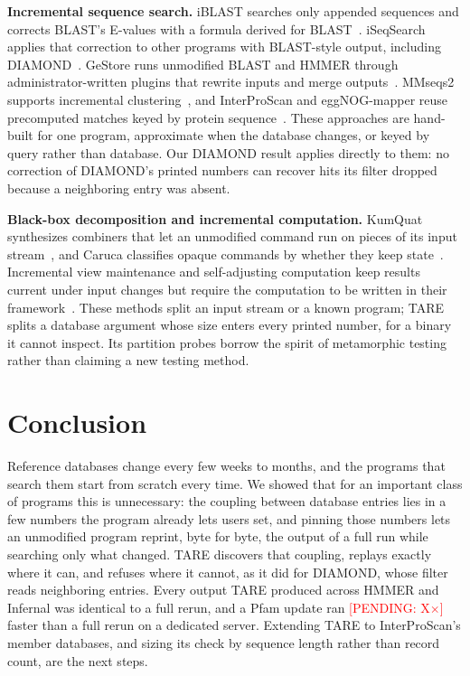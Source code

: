 \documentclass[letterpaper,twocolumn,10pt]{article}
\theoremstyle{definition}
\newcommand{\sys}{TARE\xspace}
\newcommand{\pending}[1]{\textcolor{red}{[PENDING: #1]}}
\begin{document}
\textbf{Incremental sequence search.} iBLAST searches only appended sequences and corrects BLAST's E-values with a formula
derived for BLAST~\cite{dash2021iblast}. iSeqSearch applies that correction to other programs with BLAST-style output,
including DIAMOND~\cite{yoo2025iseqsearch}. GeStore runs unmodified BLAST and HMMER through administrator-written plugins
that rewrite inputs and merge outputs~\cite{pedersen2014gestore}. MMseqs2 supports incremental
clustering~\cite{steinegger2017mmseqs2}, and InterProScan and eggNOG-mapper reuse precomputed matches keyed by protein
sequence~\cite{jones2014interproscan,cantalapiedra2021eggnog}. These approaches are hand-built for one program, approximate
when the database changes, or keyed by query rather than database. Our DIAMOND result applies directly to them: no
correction of DIAMOND's printed numbers can recover hits its filter dropped because a neighboring entry was absent.

\textbf{Black-box decomposition and incremental computation.} KumQuat synthesizes combiners that let an unmodified command
run on pieces of its input stream~\cite{shen2022kumquat}, and Caruca classifies opaque commands by whether they keep
state~\cite{lamprou2025caruca}. Incremental view maintenance and self-adjusting computation keep results current under
input changes but require the computation to be written in their framework~\cite{blakeley1986views,acar2003selective}.
These methods split an input stream or a known program; \sys splits a database argument whose size enters every printed
number, for a binary it cannot inspect. Its partition probes borrow the spirit of metamorphic
testing~\cite{chen1998metamorphic,segura2016survey} rather than claiming a new testing method.

\section{Conclusion}
\label{sec:conclusion}

Reference databases change every few weeks to months, and the programs that search them start from scratch every time. We
showed that for an important class of programs this is unnecessary: the coupling between database entries lies in a few
numbers the program already lets users set, and pinning those numbers lets an unmodified program reprint, byte for byte, the
output of a full run while searching only what changed. \sys discovers that coupling, replays exactly where it can, and
refuses where it cannot, as it did for DIAMOND, whose filter reads neighboring entries. Every output \sys produced across
HMMER and Infernal was identical to a full rerun, and a Pfam update ran \pending{X$\times$} faster than a full rerun on a
dedicated server. Extending \sys to InterProScan's member databases, and sizing its check by sequence length rather than
record count, are the next steps.
\end{document}
